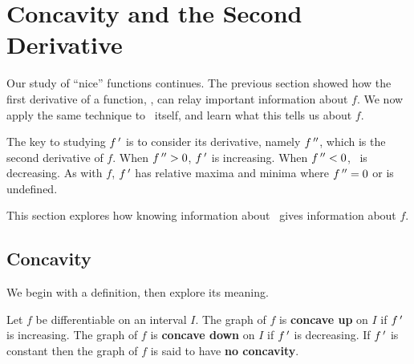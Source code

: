 \section{Concavity and the Second Derivative}\label{sec:concavity}

Our study of ``nice'' functions continues. The previous section showed how the first derivative of a function, \fp, can relay important information about $f$. We now apply the same technique to \fp\ itself, and learn what this tells us about $f$.

The key to studying $f\,'$ is to consider its derivative, namely  $f\,''$, which is the second derivative of $f$.  When $f\,''>0$, $f\,'$ is increasing. When $f\,''<0$, \fp\ is decreasing.  As with $f$, $f\,'$ has relative maxima and minima where $f\,''=0$ or is undefined.

This section explores how knowing information about \fpp\ gives information about $f$.

\subsection{Concavity}

We begin with a definition, then explore its meaning.


\begin{definition}\label{def:concavity}%
Let $f$ be differentiable on an interval $I$. 
The graph of $f$ is \textbf{concave up} on $I$ if $f\,'$ is increasing. The graph of $f$ is \textbf{concave down} on $I$ if $f\,'$ is decreasing. If $f\,'$ is constant then the graph of $f$ is said to have \textbf{no concavity}.
\end{definition}

